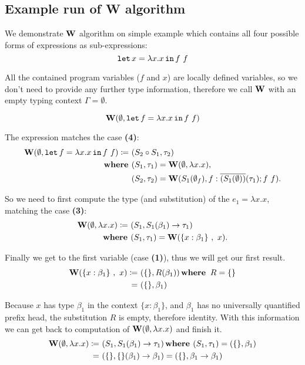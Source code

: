 \documentclass[a4paper,oneside]{memoir}
\begin{document}
\subsection{Example run of W algorithm}

We demonstrate $\operatorname{\textbf{W}}$ algorithm on simple example which contains all four possible forms of expressions as sub-expressions:
$$\texttt{let} \, x = \lambda x . x \, \texttt{in} \, f~f$$

All the contained program variables
($f$ and $x$) are locally defined variables, so we don't need to provide any further type
information, therefore we call $\operatorname{\textbf{W}}$ with an empty typing context $\Gamma = \emptyset$. 

$$\operatorname{\textbf{W}}(\emptyset, \texttt{let} \, f = \lambda x . x \, \texttt{in} \, f~f)$$

The expression matches the case \textbf{(4)}:
\begin{align*}
\operatorname{\textbf{W}}(\emptyset, \texttt{let} \, f = \lambda x . x \, \texttt{in} \, f~f) \coloneqq ~ & (S_2 \circ S_1, \tau_2) \\
\operatorname{\textbf{where~}} & (S_1, \tau_1) = \operatorname{\textbf{W}}(\emptyset, \lambda x . x), \\
       & (S_2, \tau_2) = \operatorname{\textbf{W}}(S_1(\emptyset_f),f:\overline{(S_1(\emptyset))}(\tau_1); f~f).
\end{align*}

So we need to first compute the type (and substitution) of the $e_1 = \lambda x . x$, matching the case \textbf{(3)}:
\begin{align*}
\operatorname{\textbf{W}}(\emptyset, \lambda x .x) \coloneqq ~ & (S_1, S_1(\beta_1) \rightarrow \tau_1 ) \\
\operatorname{\textbf{where~}} & (S_1, \tau_1) = \operatorname{\textbf{W}}(\{x : \beta_1 \}~,~ x).
\end{align*}

Finally we get to the first variable (case \textbf{(1)}), thus we will get our first result.
\begin{align*}
\operatorname{\textbf{W}}(\{x : \beta_1 \}~,~ x) \coloneqq ~ & ( \{\}, R(\beta_1) ) \operatorname{\textbf{where~}}  R = \{\} \\
                              = ~ & ( \{\}, \beta_1 )
\end{align*}

Because $x$ has type $\beta_1$ in the context $\{x : \beta_1\}$, and $\beta_1$ has no universally quantified prefix head, the substitution $R$ is empty, therefore identity. With this information we can get back to computation of $\operatorname{\textbf{W}}(\emptyset, \lambda x .x)$ and finish it. 
\begin{align*}
\operatorname{\textbf{W}}(\emptyset, \lambda x . x) \coloneqq ~ & (S_1, S_1(\beta_1) \rightarrow \tau_1 ) \operatorname{\textbf{where~}} (S_1, \tau_1) = ( \{\}, \beta_1 ) \\
 = ~ & (\{\}, \{\}(\beta_1) \rightarrow \beta_1 ) = (\{\}, \beta_1 \rightarrow \beta_1 )
\end{align*}
\end{document}
